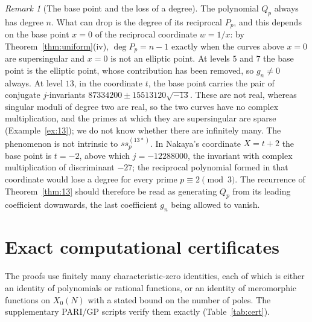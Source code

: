 \documentclass[11pt,a4paper]{article}
\theoremstyle{definition}
\theoremstyle{remark}
\newtheorem{remark}[theorem]{Remark}
\newcommand{\ssp}{\mathit{ss}_p}
\numberwithin{equation}{section}
\begin{document}
\begin{remark}[The base point and the loss of a degree]\label{rem:basepoint}
The polynomial $Q_p$ always has degree $n$. What can drop is the degree of
its reciprocal $P_p$, and this depends on the base point $x=0$ of the
reciprocal coordinate $w=1/x$: by Theorem~\ref{thm:uniform}(iv),
$\deg P_p=n-1$ exactly when the curves above $x=0$ are supersingular and
$x=0$ is not an elliptic point. At levels $5$ and $7$ the base point is the
elliptic point, whose contribution has been removed, so $g_n\ne0$ always. At
level $13$, in the coordinate $t$, the base point carries the pair of
conjugate $j$-invariants $87334200\pm15513120\sqrt{-13}$. These are not real,
whereas singular moduli of degree two are real, so the two curves have no
complex multiplication, and the primes at which they are supersingular are
sparse (Example~\ref{ex:13}); we do not know whether there are infinitely
many. The phenomenon is not intrinsic to $\ssp^{(13*)}$. In Nakaya's
coordinate $X=t+2$ the base point is $t=-2$, above which
$j=-12288000$, the invariant with complex multiplication of discriminant
$-27$; the reciprocal polynomial formed in that coordinate would lose a degree
for every prime $p\equiv2\pmod3$. The recurrence of Theorem~\ref{thm:13}
should therefore be read as generating $Q_p$ from its leading coefficient
downwards, the last coefficient $g_n$ being allowed to vanish.
\end{remark}

\appendix
\section{Exact computational certificates}\label{app:certificates}

The proofs use finitely many characteristic-zero identities, each of which is
either an identity of polynomials or rational functions, or an identity of
meromorphic functions on $X_0(N)$ with a stated bound on the number of poles.
The supplementary PARI/GP scripts verify them exactly
(Table~\ref{tab:cert}).
\end{document}
